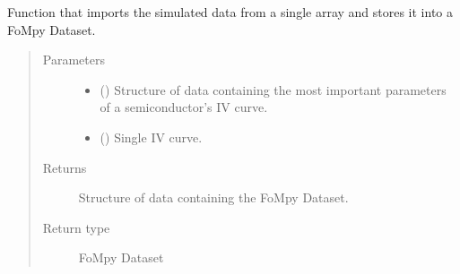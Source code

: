 \documentclass[letterpaper,10pt,english,openany, oneside]{sphinxmanual}
\begin{document}

\begin{fulllineitems}
\label{\detokenize{index:fompy.fds.curve}}
Function that imports the simulated data from a single array and
stores it into a FoMpy Dataset.
\begin{quote}\begin{description}
\item[{Parameters}] \leavevmode\begin{itemize}
\item {} 
 () \textendash{} Structure of data containing the most important parameters of a semiconductor’s IV curve.

\item {} 
 () \textendash{} Single IV curve.

\end{itemize}

\item[{Returns}] \leavevmode
{} \textendash{} Structure of data containing the FoMpy Dataset.

\item[{Return type}] \leavevmode
FoMpy Dataset

\end{description}\end{quote}

\end{fulllineitems}

\end{document}
